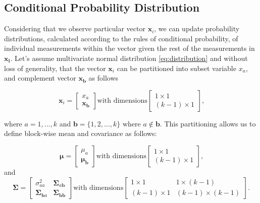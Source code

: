 \subsection{Conditional Probability Distribution}\label{AA:Conditional}
Considering that we observe particular vector $\boldsymbol{x}_i$, we can update probability distributions, calculated according to the rules of conditional probability, of individual measurements within the vector given the rest of the measurements in $\boldsymbol{x_{i}}$.
Let's assume multivariate normal distribution \eqref{eq:distribution} and without loss of generality, that the vector $\boldsymbol{x}_i$ can be partitioned into subset variable $x_a$, and complement vector $\boldsymbol{x_b}$ as follows

\begin{equation}
  \boldsymbol{x}_i = \begin{bmatrix}x_a \\ \boldsymbol{x_b} \end{bmatrix} \text{with dimensions} \begin{bmatrix}1\times 1 \\ (k - 1) \times 1\end{bmatrix} \text{,}
\end{equation}

where $a = 1,...,k$ and $\boldsymbol{b} = \{1, 2, \ldots, k\} \text{ where }a \notin \boldsymbol{b}$. This partitioning allows us to define block-wise mean and covariance as follows:

\begin{equation}
  \boldsymbol\mu = \begin{bmatrix}\mu_a \\ \boldsymbol{\mu_b} \end{bmatrix} \text{with dimensions} \begin{bmatrix}1\times 1 \\ (k - 1) \times 1\end{bmatrix} \text{,}
\end{equation}
and
\begin{equation}
  \boldsymbol\Sigma = \begin{bmatrix}\sigma_{aa}^2 & \boldsymbol\Sigma_{a\boldsymbol{b}} \\ \boldsymbol\Sigma_{\boldsymbol{b}a} & \boldsymbol\Sigma_{\boldsymbol{bb}} \end{bmatrix}
  \text{with dimensions} \begin{bmatrix}1\times 1 & 1\times (k - 1) \\ (k - 1) \times 1 & (k - 1) \times (k - 1)\end{bmatrix} \text{.} \label{eq:sigma}
\end{equation}

